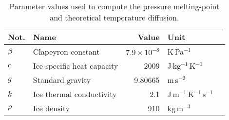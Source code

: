 \documentclass[utf8]{article}
\begin{document}
    \begin{table}
      \caption{%
        Parameter values used to compute the pressure melting-point and
        theoretical temperature diffusion.}
      \label{tab:params}
      \scalebox{0.75}
      {\begin{tabular}{llrll}
        \hline
        Not.    & Name & Value & Unit \\
        \hline
        $\beta$ & Clapeyron constant
                & $7.9\times10^{-8}$    & K\,Pa$^{-1}$                      \\
        $c$     & Ice specific heat capacity
                & 2009                  & J\,kg$^{-1}$\,K$^{-1}$            \\
        $g$     & Standard gravity
                & 9.80665               & m\,s$^{-2}$                       \\
        $k$     & Ice thermal conductivity
                & 2.1                   & J\,m$^{-1}$\,K$^{-1}$\,s$^{-1}$   \\
        $\rho$  & Ice density
                & 910                   & kg\,m$^{-3}$                      \\
        \hline
      \end{tabular}}
    \end{table}

\end{document}
